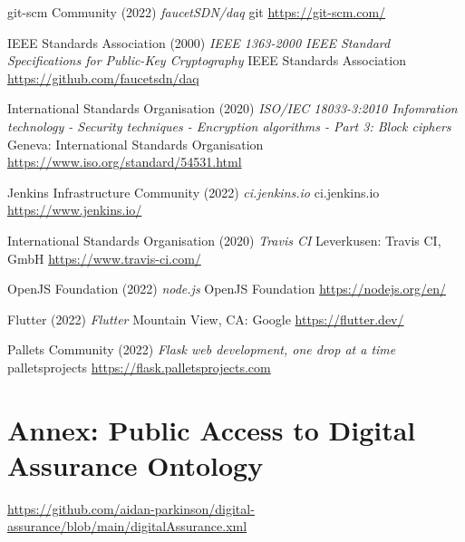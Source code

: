 \documentclass[11pt, oneside]{article}   	%
\begin{document}
\begin{thebibliography}{99}
 git-scm Community (2022)
\emph{faucetSDN/daq}
git
\url{https://git-scm.com/}

 IEEE Standards Association (2000)
\emph{IEEE 1363-2000 IEEE Standard Specifications for Public-Key Cryptography}
IEEE Standards Association
\url{https://github.com/faucetsdn/daq}

 International Standards Organisation (2020)
\emph{ISO/IEC 18033-3:2010 Infomration technology - Security techniques - Encryption algorithms - Part 3: Block ciphers}
Geneva: International Standards Organisation
\url{https://www.iso.org/standard/54531.html}

 Jenkins Infrastructure Community (2022)
\emph{ci.jenkins.io}
ci.jenkins.io
\url{https://www.jenkins.io/}

 International Standards Organisation (2020)
\emph{Travis CI}
Leverkusen: Travis CI, GmbH
\url{https://www.travis-ci.com/}


 OpenJS Foundation (2022)
\emph{node.js}
OpenJS Foundation
\url{https://nodejs.org/en/}

 Flutter (2022)
\emph{Flutter}
Mountain View, CA: Google 
\url{https://flutter.dev/}

 Pallets Community (2022)
\emph{Flask web development, one drop at a time}
palletsprojects
\url{https://flask.palletsprojects.com}

\end{thebibliography}

\section{Annex: Public Access to Digital Assurance Ontology}

\url{https://github.com/aidan-parkinson/digital-assurance/blob/main/digitalAssurance.xml}
\end{document}

